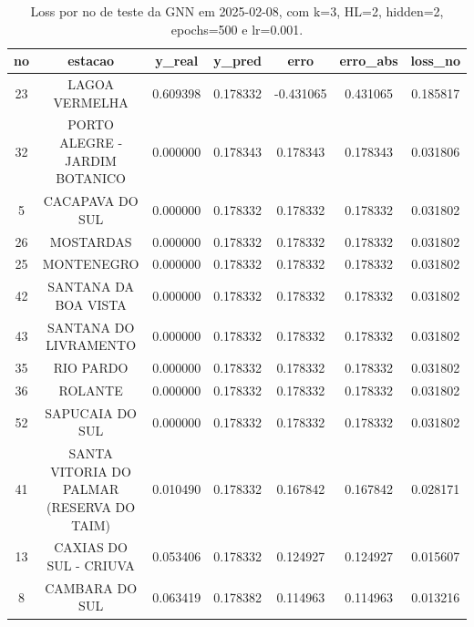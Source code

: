\begin{table}[h]
\centering
\caption{Loss por no de teste da GNN em 2025-02-08, com k=3, HL=2, hidden=2, epochs=500 e lr=0.001.}
\label{tab:gnn_loss_k3_hl2_h2_e500_d20250208}
\begin{tabular}{ccccccc}
\toprule
no & estacao & y\_real & y\_pred & erro & erro\_abs & loss\_no \\
\midrule
23 & LAGOA VERMELHA & 0.609398 & 0.178332 & -0.431065 & 0.431065 & 0.185817 \\
32 & PORTO ALEGRE - JARDIM BOTANICO & 0.000000 & 0.178343 & 0.178343 & 0.178343 & 0.031806 \\
5 & CACAPAVA DO SUL & 0.000000 & 0.178332 & 0.178332 & 0.178332 & 0.031802 \\
26 & MOSTARDAS & 0.000000 & 0.178332 & 0.178332 & 0.178332 & 0.031802 \\
25 & MONTENEGRO & 0.000000 & 0.178332 & 0.178332 & 0.178332 & 0.031802 \\
42 & SANTANA DA BOA VISTA & 0.000000 & 0.178332 & 0.178332 & 0.178332 & 0.031802 \\
43 & SANTANA DO LIVRAMENTO & 0.000000 & 0.178332 & 0.178332 & 0.178332 & 0.031802 \\
35 & RIO PARDO & 0.000000 & 0.178332 & 0.178332 & 0.178332 & 0.031802 \\
36 & ROLANTE & 0.000000 & 0.178332 & 0.178332 & 0.178332 & 0.031802 \\
52 & SAPUCAIA DO SUL & 0.000000 & 0.178332 & 0.178332 & 0.178332 & 0.031802 \\
41 & SANTA VITORIA DO PALMAR (RESERVA DO TAIM) & 0.010490 & 0.178332 & 0.167842 & 0.167842 & 0.028171 \\
13 & CAXIAS DO SUL - CRIUVA & 0.053406 & 0.178332 & 0.124927 & 0.124927 & 0.015607 \\
8 & CAMBARA DO SUL & 0.063419 & 0.178382 & 0.114963 & 0.114963 & 0.013216 \\
\bottomrule
\end{tabular}
\end{table}
